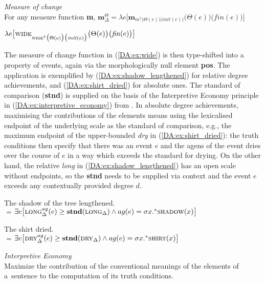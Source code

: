 \documentclass[output=paper]{langscibook}
\begin{document}
\ea\label{DA:ex:Measure_of_change} \emph{Measure of change}\\
For any measure function \textbf{m},
\(\mathbf{m}^\Theta_\Delta=\lambda e\big[\mathbf{m}_{m^\uparrow\big(\Theta(e)\big)\big(\mathit{init}(e)\big)}\big(\Theta(e)\big)\big(\mathit{fin}(e)\big)\big]\)
\z

\ea\label{DA:ex:wide} \(\lambda e\big[\textsc{wide}_{\textsc{wide}^\uparrow\big(\Theta(e)\big)\big(\mathit{init}(e)\big)}\big(\Theta(e)\big)\big(\mathit{fin}(e)\big)\big]\)
\z

\noindent The measure of change function in (\ref{DA:ex:wide}) is then type-shifted into a property of events, again via the morphologically null element \textbf{pos}. The application is exemplified by (\ref{DA:ex:shadow_lengthened}) for relative degree achievements, and (\ref{DA:ex:shirt_dried}) for absolute ones. The standard of comparison (\textbf{stnd}) is supplied on the basis of the Interpretive Economy principle in (\ref{DA:ex:interpretive_economy}) from \citet{kennedy2008measure}. In absolute degree achievements, maximising the contributions of the elements means using the lexicalised endpoint of the underlying scale as the standard of comparison, e.g., the maximum endpoint of the upper-bounded \textit{dry} in (\ref{DA:ex:shirt_dried}): the truth conditions then specify that there was an event $e$ and the agens of the event dries over the course of $e$ in a way which exceeds the standard for drying. On the other hand, the relative \textit{long} in (\ref{DA:ex:shadow_lengthened}) has an open scale without endpoints, so the \textbf{stnd} needs to be supplied via context and the event $e$ exceeds any contextually provided degree $d$.

\ea\label{DA:ex:shadow_lengthened} The shadow of the tree lengthened.\\ ${}={}$\(\exists e\big[\textsc{long}^{ag}_{\Delta}(e) \geq \textbf{stnd}(\textsc{long}_\Delta) \wedge ag(e) = \sigma x.^*\textsc{shadow}(x)\big]\)
\z

\ea\label{DA:ex:shirt_dried} The shirt dried. \\ ${}={}$\(\exists e\big[\textsc{dry}^{ag}_{\Delta}(e) \geq \textbf{stnd}(\textsc{dry}_\Delta) \wedge ag(e) =\sigma x.^*\textsc{shirt}(x)\big]\)
\z

\eanoraggedright\label{DA:ex:interpretive_economy}\emph{Interpretive Economy} \citep[ex. 18]{kennedy2008measure}\\
Maximize the contribution of the conventional meanings of the elements
of a~sentence to the computation of its truth conditions.
\z
\end{document}
